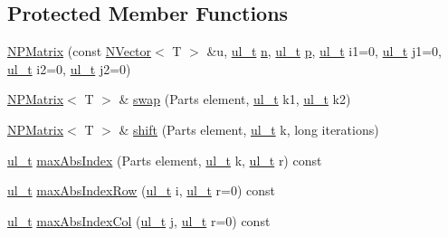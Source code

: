 \subsection*{Protected Member Functions}
\begin{DoxyCompactItemize}
\item 
\mbox{\hyperlink{class_n_p_matrix_ab8c664f1aa435b8b1bb5e1fdd293423f}{N\+P\+Matrix}} (const \mbox{\hyperlink{class_n_vector}{N\+Vector}}$<$ T $>$ \&u, \mbox{\hyperlink{typedef_8h_a1b140a2034db3f5dfe18a987745df43a}{ul\+\_\+t}} \mbox{\hyperlink{class_n_p_matrix_afc181b7652d9427125c72c38d7c1498d}{n}}, \mbox{\hyperlink{typedef_8h_a1b140a2034db3f5dfe18a987745df43a}{ul\+\_\+t}} \mbox{\hyperlink{class_n_p_matrix_a3beee8acb5babf62d2b4f212ac5d18e8}{p}}, \mbox{\hyperlink{typedef_8h_a1b140a2034db3f5dfe18a987745df43a}{ul\+\_\+t}} i1=0, \mbox{\hyperlink{typedef_8h_a1b140a2034db3f5dfe18a987745df43a}{ul\+\_\+t}} j1=0, \mbox{\hyperlink{typedef_8h_a1b140a2034db3f5dfe18a987745df43a}{ul\+\_\+t}} i2=0, \mbox{\hyperlink{typedef_8h_a1b140a2034db3f5dfe18a987745df43a}{ul\+\_\+t}} j2=0)
\item 
\mbox{\hyperlink{class_n_p_matrix}{N\+P\+Matrix}}$<$ T $>$ \& \mbox{\hyperlink{class_n_p_matrix_aafbf2155265a070f3ae418828e40359e}{swap}} (Parts element, \mbox{\hyperlink{typedef_8h_a1b140a2034db3f5dfe18a987745df43a}{ul\+\_\+t}} k1, \mbox{\hyperlink{typedef_8h_a1b140a2034db3f5dfe18a987745df43a}{ul\+\_\+t}} k2)
\item 
\mbox{\hyperlink{class_n_p_matrix}{N\+P\+Matrix}}$<$ T $>$ \& \mbox{\hyperlink{class_n_p_matrix_a83118d4efa26372fd12bd0a2ce77f155}{shift}} (Parts element, \mbox{\hyperlink{typedef_8h_a1b140a2034db3f5dfe18a987745df43a}{ul\+\_\+t}} k, long iterations)
\item 
\mbox{\hyperlink{typedef_8h_a1b140a2034db3f5dfe18a987745df43a}{ul\+\_\+t}} \mbox{\hyperlink{class_n_p_matrix_a4bff3c9956c688973307fd9c627e0ebd}{max\+Abs\+Index}} (Parts element, \mbox{\hyperlink{typedef_8h_a1b140a2034db3f5dfe18a987745df43a}{ul\+\_\+t}} k, \mbox{\hyperlink{typedef_8h_a1b140a2034db3f5dfe18a987745df43a}{ul\+\_\+t}} r) const
\item 
\mbox{\hyperlink{typedef_8h_a1b140a2034db3f5dfe18a987745df43a}{ul\+\_\+t}} \mbox{\hyperlink{class_n_p_matrix_a332d3f82121d71e1e349aa450af39207}{max\+Abs\+Index\+Row}} (\mbox{\hyperlink{typedef_8h_a1b140a2034db3f5dfe18a987745df43a}{ul\+\_\+t}} i, \mbox{\hyperlink{typedef_8h_a1b140a2034db3f5dfe18a987745df43a}{ul\+\_\+t}} r=0) const
\item 
\mbox{\hyperlink{typedef_8h_a1b140a2034db3f5dfe18a987745df43a}{ul\+\_\+t}} \mbox{\hyperlink{class_n_p_matrix_a2b5a2c3d646df900367ad91450d1ef33}{max\+Abs\+Index\+Col}} (\mbox{\hyperlink{typedef_8h_a1b140a2034db3f5dfe18a987745df43a}{ul\+\_\+t}} j, \mbox{\hyperlink{typedef_8h_a1b140a2034db3f5dfe18a987745df43a}{ul\+\_\+t}} r=0) const

\end{DoxyCompactItemize}

